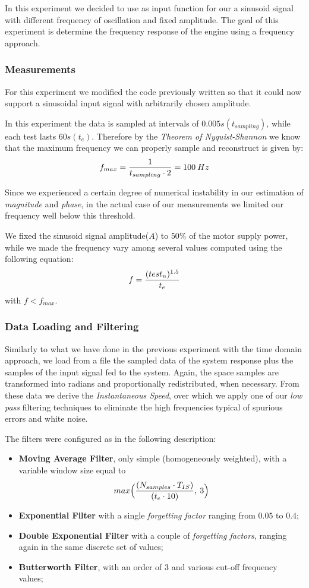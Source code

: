 In this experiment we decided to use as input function for our \LEGOMOTOR{} a sinusoid signal with different frequency of oscillation and fixed amplitude. The goal of this experiment is determine the frequency response of the \LEGOMOTOR{} engine using a frequency approach.

\subsubsection{Measurements}

For this experiment we modified the code previously written so that it could now support a sinusoidal input signal with arbitrarily chosen amplitude.

In this experiment the data is sampled at intervals of $0.005s (t_{sampling})$, while each test lasts $60s (t_e)$. Therefore by the \emph{Theorem of Nyquist-Shannon} we know that the maximum frequency we can properly sample and reconstruct is given by: 
\[
f_{max} = {1  \over { t_{sampling} \cdot 2} } = 100\: Hz 
\]

Since we experienced a certain degree of numerical instability in our estimation of \textit{magnitude} and \textit{phase}, in the actual case of our measurements we limited our frequency well below this threshold.

We fixed the sinusoid signal amplitude($A$) to $50\%$ of the motor supply power, while we made the frequency vary among several values computed using the following equation:
\[
f ={ (test_{n})^{1.5} \over t_e }
\]
with $f < f_{max} $.

\subsubsection{Data Loading and Filtering}

Similarly to what we have done in the previous experiment with the time domain approach, we load from a file the sampled data of the system response plus the samples of the input signal fed to the system. Again, the space samples are transformed into radians and proportionally redistributed, when necessary. From these data we derive the \textit{Instantaneous Speed}, over which we apply one of our \textit{low pass} filtering techniques to eliminate the high frequencies typical of spurious errors and white noise.

The filters were configured as in the following description:
\begin{itemize}
\item \textbf{Moving Average Filter}, only simple (homogeneously weighted), with a variable window size equal to
\[
	max\Big{(}
	{(N_{samples} \cdot T_{IS}) \over (t_{e} \cdot 10)},\: 3\Big{)}
\]
\item \textbf{Exponential Filter} with a single \textit{forgetting factor} ranging from $0.05$ to $0.4$;
\item \textbf{Double Exponential Filter} with a couple of \textit{forgetting factors}, ranging again in the same discrete set of values;
\item \textbf{Butterworth Filter}, with an order of $3$ and various cut-off frequency values;
\end{itemize}

